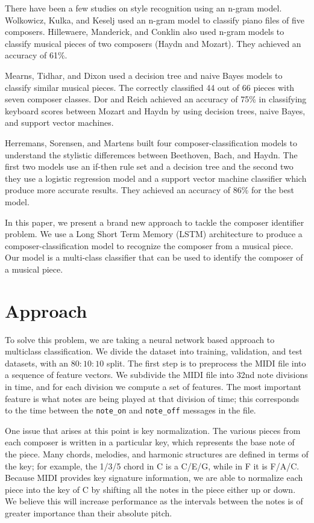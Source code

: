 \documentclass[11pt,a4paper]{article}
\begin{document}
There have been a few studies on style recognition using an n-gram model. Wolkowicz, Kulka, and Keselj \cite{n-gram} used an n-gram model to classify piano files of five composers.  Hillewaere, Manderick, and Conklin \cite{Hillewaere} also used n-gram models to classify musical pieces of two composers (Haydn and Mozart). They achieved an accuracy of 61\%.

Mearns, Tidhar, and Dixon \cite{Mearns} used a decision tree and naive Bayes models to classify similar musical pieces. The correctly classified 44 out of 66 pieces with seven composer classes. Dor and Reich \cite{Dor} achieved an accuracy of 75\% in classifying keyboard scores between Mozart and Haydn by using decision trees, naive Bayes, and support vector machines.

Herremans, Sorensen, and Martens \cite {Herremans} built four composer-classification models to understand the stylistic differemces between Beethoven, Bach, and Haydn. The first two models use an if-then rule set and a decision tree and the second two they use a logistic regression model and a support vector machine classifier which produce more accurate results. They achieved an accuracy of 86\% for the best model. 

In this paper, we present a brand new approach to tackle the composer identifier problem. We use a Long Short Term Memory (LSTM) architecture to produce a composer-classification model to recognize the composer from a musical piece. Our model is a multi-class classifier that can be used to identify the composer of a musical piece. 


\section{Approach}
To solve this problem, we are taking a neural network based approach to multiclass classification. We divide the dataset into training, validation, and test datasets, with an $80:10:10$ split. The first step is to preprocess the MIDI file into a sequence of feature vectors. We subdivide the MIDI file into 32nd note divisions in time, and for each division we compute a set of features. The most important feature is what notes are being played at that division of time; this corresponds to the time between the \texttt{note\_on}  and \texttt{note\_off}  messages in the file. 

One issue that arises at this point is key normalization. The various pieces from each composer is written in a particular key, which represents the base note of the piece. Many chords, melodies, and harmonic structures are defined in terms of the key; for example, the 1/3/5 chord in C is a C/E/G, while in F it is F/A/C. Because MIDI provides key signature information, we are able to normalize each piece into the key of C by shifting all the notes in the piece either up or down. We believe this will increase performance as the intervals between the notes is of greater importance than their absolute pitch.
\end{document}

